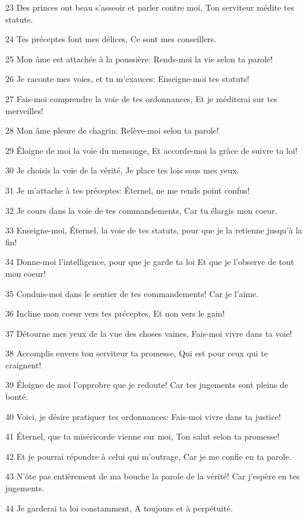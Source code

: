 \par 23 Des princes ont beau s'asseoir et parler contre moi, Ton serviteur médite tes statuts.
\par 24 Tes préceptes font mes délices, Ce sont mes conseillers.
\par 25 Mon âme est attachée à la poussière: Rends-moi la vie selon ta parole!
\par 26 Je raconte mes voies, et tu m'exauces: Enseigne-moi tes statuts!
\par 27 Fais-moi comprendre la voie de tes ordonnances, Et je méditerai sur tes merveilles!
\par 28 Mon âme pleure de chagrin: Relève-moi selon ta parole!
\par 29 Éloigne de moi la voie du mensonge, Et accorde-moi la grâce de suivre ta loi!
\par 30 Je choisis la voie de la vérité, Je place tes lois sous mes yeux.
\par 31 Je m'attache à tes préceptes: Éternel, ne me rends point confus!
\par 32 Je cours dans la voie de tes commandements, Car tu élargis mon coeur.
\par 33 Enseigne-moi, Éternel, la voie de tes statuts, pour que je la retienne jusqu'à la fin!
\par 34 Donne-moi l'intelligence, pour que je garde ta loi Et que je l'observe de tout mon coeur!
\par 35 Conduis-moi dans le sentier de tes commandements! Car je l'aime.
\par 36 Incline mon coeur vers tes préceptes, Et non vers le gain!
\par 37 Détourne mes yeux de la vue des choses vaines, Fais-moi vivre dans ta voie!
\par 38 Accomplis envers ton serviteur ta promesse, Qui est pour ceux qui te craignent!
\par 39 Éloigne de moi l'opprobre que je redoute! Car tes jugements sont pleins de bonté.
\par 40 Voici, je désire pratiquer tes ordonnances: Fais-moi vivre dans ta justice!
\par 41 Éternel, que ta miséricorde vienne sur moi, Ton salut selon ta promesse!
\par 42 Et je pourrai répondre à celui qui m'outrage, Car je me confie en ta parole.
\par 43 N'ôte pas entièrement de ma bouche la parole de la vérité! Car j'espère en tes jugements.
\par 44 Je garderai ta loi constamment, A toujours et à perpétuité.
